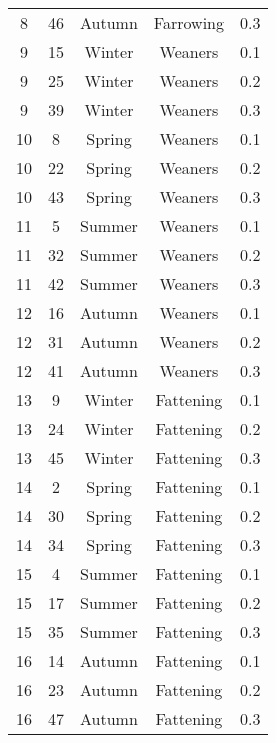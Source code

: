 \begin{table}[]
\begin{tabular}{ccccc}
8                   & 46     & Autumn & Farrowing & 0.3    \\
9                   & 15     & Winter & Weaners   & 0.1    \\
9                   & 25     & Winter & Weaners   & 0.2    \\
9                   & 39     & Winter & Weaners   & 0.3    \\
10                  & 8      & Spring & Weaners   & 0.1    \\
10                  & 22     & Spring & Weaners   & 0.2    \\
10                  & 43     & Spring & Weaners   & 0.3    \\
11                  & 5      & Summer & Weaners   & 0.1    \\
11                  & 32     & Summer & Weaners   & 0.2    \\
11                  & 42     & Summer & Weaners   & 0.3    \\
12                  & 16     & Autumn & Weaners   & 0.1    \\
12                  & 31     & Autumn & Weaners   & 0.2    \\
12                  & 41     & Autumn & Weaners   & 0.3    \\
13                  & 9      & Winter & Fattening & 0.1    \\
13                  & 24     & Winter & Fattening & 0.2    \\
13                  & 45     & Winter & Fattening & 0.3    \\
14                  & 2      & Spring & Fattening & 0.1    \\
14                  & 30     & Spring & Fattening & 0.2    \\
14                  & 34     & Spring & Fattening & 0.3    \\
15                  & 4      & Summer & Fattening & 0.1    \\
15                  & 17     & Summer & Fattening & 0.2    \\
15                  & 35     & Summer & Fattening & 0.3    \\
16                  & 14     & Autumn & Fattening & 0.1    \\
16                  & 23     & Autumn & Fattening & 0.2    \\
16                  & 47     & Autumn & Fattening & 0.3   
\end{tabular}
\end{table}